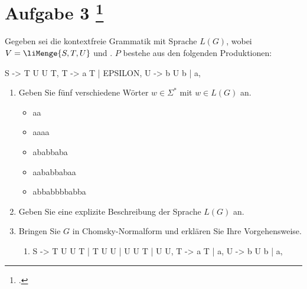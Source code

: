 \documentclass{bschlangaul-aufgabe}
\begin{document}
\let\schrittE=\liChomskyUeberErklaerung

\section{Aufgabe 3
\footcite{examen:66115:2019:03}}

Gegeben sei die kontextfreie Grammatik \liGrammatik{} mit Sprache
$L(G)$, wobei $V = \liMenge{S,T,U}$ und . $P$ bestehe
aus den folgenden Produktionen:

\begin{liProduktionsRegeln}
S -> T U U T,
T -> a T | EPSILON,
U -> b U b | a,
\end{liProduktionsRegeln}
\begin{enumerate}


\item Geben Sie fünf verschiedene Wörter $w \in \Sigma^*$ mit $w \in
L(G)$ an.

\begin{liAntwort}
\begin{itemize}
\item aa
\item aaaa
\item ababbaba
\item aababbabaa
\item abbabbbbabba
\end{itemize}
\end{liAntwort}


\item Geben Sie eine explizite Beschreibung der Sprache $L(G)$ an.

\begin{liAntwort}
\end{liAntwort}


\item Bringen Sie $G$ in Chomsky-Normalform und erklären Sie Ihre
Vorgehensweise.

\begin{liAntwort}
\begin{enumerate}
\item \schrittE{1}

\begin{liProduktionsRegeln}
S -> T U U T | T U U | U U T | U U,
T -> a T | a,
U -> b U b | a,
\end{liProduktionsRegeln}


\end{enumerate}
\end{liAntwort}
\end{enumerate}
\end{document}
